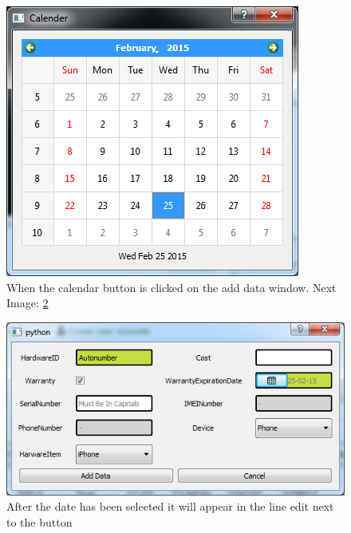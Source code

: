 \begin{figure}[H]
    \includegraphics[width=\textwidth]{./Testing/Images/Calendar.png}
    \caption{When the calendar button is clicked on the add data window. Next Image: \ref{fig:CalendarAdd}} \label{fig:Calendar}
\end{figure}

\begin{figure}[H]
    \includegraphics[width=\textwidth]{./Testing/Images/CalendarAddData.png}
    \caption{After the date has been selected it will appear in the line edit next to the button} \label{fig:CalendarAdd}
\end{figure}

